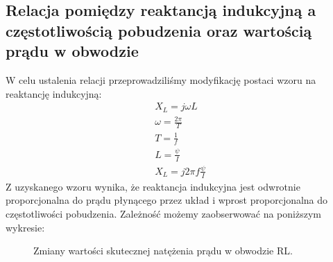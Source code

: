 \documentclass[polish,polish,a4paper]{article}
\begin{document}
\subsection{Relacja pomiędzy reaktancją indukcyjną a częstotliwością pobudzenia oraz wartością prądu w obwodzie}

W celu ustalenia relacji przeprowadziliśmy modyfikację postaci wzoru na reaktancję indukcyjną:
\begin{gather}
X_{L} = j\omega L \\
\omega = \frac{2\pi}{T} \\
T = \frac{1}{f} \\
L = \frac{\psi}{I} \\
X_{L} = j2\pi f\frac{\psi}{I}
\end{gather}
Z uzyskanego wzoru wynika, że reaktancja indukcyjna jest odwrotnie proporcjonalna do prądu płynącego przez układ i wprost proporcjonalna do częstotliwości pobudzenia. Zależność możemy zaobserwować na poniższym wykresie:
\begin{figure}[H]
\centering
{}
\caption{Zmiany wartości skutecznej natężenia prądu w obwodzie RL.}
\end{figure}
\end{document}
